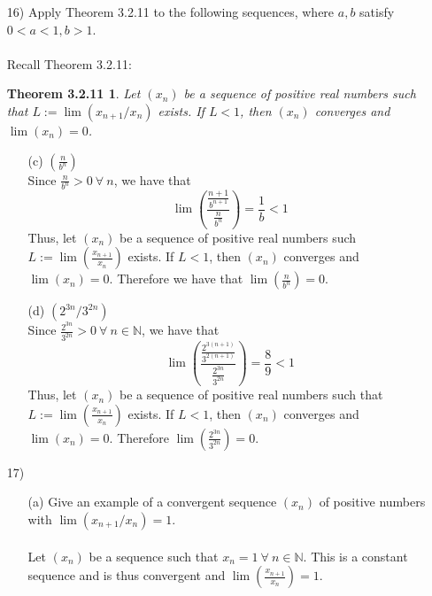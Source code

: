 \documentclass[12pt,letterpaper]{article}
\newcommand{\N}{\mathbb{N}}
\newtheorem*{3.2.11}{Theorem 3.2.11}
\theoremstyle{case}
\begin{document}
\begin{enumerate}
\begin{enumerate}
\begin{enumerate}
				So, notice that 
				\[1 \leq n^{\frac{1}{n^2}} \leq n^{\frac{1}{n}}\]
				and $\lim (n^{\frac{1}{n}})=1$. By the Squeeze Theorem,
				\[1 \leq \lim (n^{\frac{1}{n^2}}) \leq \lim (n^{\frac{1}{n}})=1\]
				Therefore we have that $\lim (n^{\frac{1}{n^2}}=1)$. \\
			\end{enumerate}
			\item[16)] Apply Theorem 3.2.11 to the following sequences, where $a, b$ satisfy $0 < a < 1, b > 1$.
			\\\\Recall Theorem 3.2.11:
			\begin{3.2.11}
				Let $(x_n)$ be a sequence of positive real numbers such that $L := \lim (x_{n+1}/x_n)$ exists. If $L < 1$, then $(x_n)$ converges and $\lim (x_n)=0$.
				\\
			\end{3.2.11}
			\begin{enumerate}
				\item[(c)] $(\frac{n}{b^n})$
				\\Since $\frac{n}{b^n}>0\ \forall\ n$, we have that
				\[\lim \left(\frac{\frac{n+1}{b^{n+1}}}{\frac{n}{b^n}}\right)=\frac{1}{b} < 1\]
				Thus, let $(x_n)$ be a sequence of positive real numbers such $L:=\lim \left(\frac{x_{n+1}}{x_n}\right)$ exists. If $L<1$, then $(x_n)$ converges and $\lim (x_n)=0$. Therefore we have that $\lim (\frac{n}{b^n}) = 0$.
				\\
				
				\item[(d)] $(2^{3n}/3^{2n})$
				\\Since $\frac{2^{3n}}{3^{2n}}>0\ \forall\ n \in \N$, we have that
				\[\lim \left(\frac{\frac{2^{3(n+1)}}{3^{2(n+1)}}}{\frac{2^{3n}}{3^{2n}}}\right)=\frac{8}{9} < 1\]
				Thus, let $(x_n)$ be a sequence of positive real numbers such that $L:= \lim (\frac{x_{n+1}}{x_n})$ exists. If $L < 1$, then $(x_n)$ converges and $\lim (x_n) = 0$. Therefore $\lim (\frac{2^{3n}}{3^{2n}})=0$.
			\end{enumerate}
			\item[17)]
			\begin{enumerate}
				\item[(a)] Give an example of a convergent sequence $(x_n)$ of positive numbers with $\lim (x_{n+1}/x_n)=1$.
				\\\\Let $(x_n)$ be a sequence such that $x_n=1\ \forall\ n \in \N$. This is a constant sequence and is thus convergent and $\lim (\frac{x_{n+1}}{x_n})=1$. \\
				

\end{enumerate}
\end{enumerate}
\end{enumerate}
\end{document}
